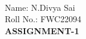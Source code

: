 \documentclass[10pt]{report}
\begin{document}
 \vspace{3mm}\\ \raggedright Name: N.Divya Sai\hspace{12cm}\\
\raggedleft Roll No.: FWC22094
\\ \centering \Large \textbf{ASSIGNMENT-1}
\end{document}
